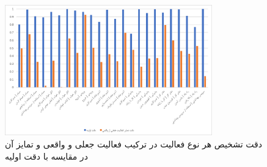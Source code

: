 \begin{figure}[H]
\centerline{\includegraphics[width=0.8\textwidth]{figs/fnatijeh2.png}}
\caption{دقت تشخیص هر نوع فعالیت در ترکیب فعالیت جعلی و واقعی و تمایز آن در مقایسه با دقت اولیه}
\label{fig:fnatijeh2}
\end{figure}
